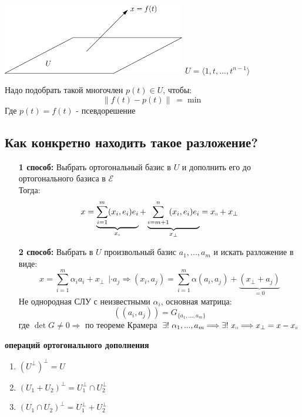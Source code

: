 \begin{example1}\tab
    \begin{center}
        \includegraphics[width=8cm]{image/Asymptote/4/linal-4-1.pdf}
        $U = \langle 1,t,...,t^{n-1} \rangle$ 
    \end{center}
    Надо подобрать такой многочлен $p(t) \in U$, чтобы: 
    $$\parallel f(t) - p(t)\parallel \ = \min$$
    Где $p(t) = f(t)$ - псевдорешение  
\end{example1}
\subsection*{Как конкретно находить такое разложение?}
\begin{itemize}
    \item[\textbf{1 способ:}] Выбрать ортогональный базис в $U$ и дополнить его до ортогонального базиса в $\mathcal{E}$\\
    Тогда:
    $$x = \underbrace{\sum \limits_{i=1}^m(x_i,e_i)e_i}_{x_\shortparallel}  + \underbrace{\sum \limits_{i=m+1}^n(x_i,e_i)e_i}_{x_\perp} = x_\shortparallel + x_\perp$$
    \item[\textbf{2 способ:}] Выбрать в $U$ произвольный базис $a_1,...,a_m$ и искать разложение в виде:
    $$x = \sum \limits_{i=1}^m \alpha_ia_i + x_\perp \ \ | \cdot a_j \Longrightarrow (x_i,a_j) = \sum \limits_{i=1}^m \alpha(a_i,a_j) + \underbrace{(x_\perp + a_j)}_{=0} $$
    Не однородная СЛУ с неизвестными $\alpha_i$, основная матрица: 
    $$((a_i,a_j)) = G_{\{a_1,...,a_m\}}$$
    где $\det G \neq 0 \Longrightarrow$ по теореме Крамера $\exists ! \ \alpha_1,...,a_m \Longrightarrow \exists ! \ x_\shortparallel \Longrightarrow x_\perp = x - x_\shortparallel$   
\end{itemize}
\begin{properties} \textbf{операций ортогонального дополнения} 
    \begin{enumerate}
        \item $(U^\perp)^\perp = U$
        \item $(U_1 + U_2)^\perp = U_1^\perp \cap U_2^\perp$
        \item $(U_1 \cap U_2)^\perp = U_1^\perp + U_2^\perp$
    \end{enumerate}
\end{properties}
